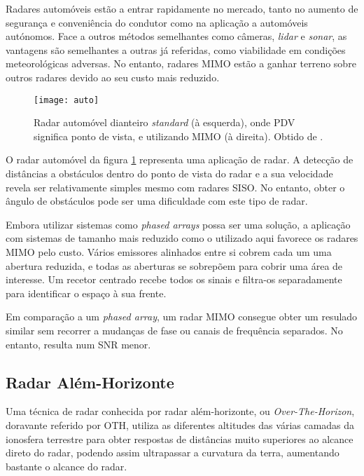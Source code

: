 \documentclass[purist,portuguese]{ist-report}
\begin{document}
Radares automóveis estão a entrar rapidamente no mercado, tanto no aumento de segurança e conveniência do condutor como na aplicação a automóveis autónomos. Face a outros métodos semelhantes como câmeras, \textit{lidar} e \textit{sonar}, as vantagens são semelhantes a outras já referidas, como viabilidade em condições meteorológicas adversas. No entanto, radares MIMO estão a ganhar terreno sobre outros radares devido ao seu custo mais reduzido.

\begin{figure}[ht]
	\centering
	\texttt{[image: auto]}
	\caption{Radar automóvel dianteiro \textit{standard} (à esquerda), onde PDV significa ponto de vista, e utilizando MIMO (à direita). Obtido de \textit{\citeauthor{mimoradarbook}} \cite{mimoradarbook}.}
	\label{fig:autorad}
\end{figure}

O radar automóvel da figura \ref{fig:autorad} representa uma aplicação de radar. A detecção de distâncias a obstáculos dentro do ponto de vista do radar e a sua velocidade revela ser relativamente simples mesmo com radares SISO. No entanto, obter o ângulo de obstáculos pode ser uma dificuldade com este tipo de radar.

Embora utilizar sistemas como \textit{phased arrays} possa ser uma solução, a aplicação com sistemas de tamanho mais reduzido como o utilizado aqui favorece os radares MIMO pelo custo. Vários emissores alinhados entre si cobrem cada um uma abertura reduzida, e todas as aberturas se sobrepõem para cobrir uma área de interesse. Um recetor centrado recebe todos os sinais e filtra-os separadamente para identificar o espaço à sua frente.

Em comparação a um \textit{phased array}, um radar MIMO consegue obter um resulado similar sem recorrer a mudanças de fase ou canais de frequência separados. No entanto, resulta num SNR menor.

\subsection{Radar Além-Horizonte}

Uma técnica de radar conhecida por radar além-horizonte, ou \textit{Over-The-Horizon}, doravante referido por OTH, utiliza as diferentes altitudes das várias camadas da ionosfera terrestre para obter respostas de distâncias muito superiores ao alcance direto do radar, podendo assim ultrapassar a curvatura da terra, aumentando bastante o alcance do radar.
\end{document}
